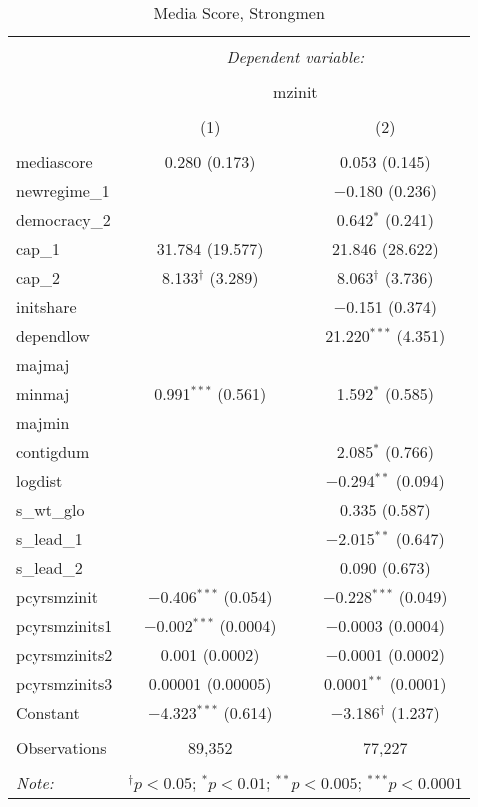 
\begin{table}[!htbp] \centering 
  \caption{Media Score, Strongmen} 
  \label{} 
\begin{tabular}{@{\extracolsep{5pt}}lcc} 
\\[-1.8ex]\hline 
\hline \\[-1.8ex] 
 & \multicolumn{2}{c}{\textit{Dependent variable:}} \\ 
\cline{2-3} 
\\[-1.8ex] & \multicolumn{2}{c}{mzinit} \\ 
\\[-1.8ex] & (1) & (2)\\ 
\hline \\[-1.8ex] 
 mediascore & 0.280 (0.173) & 0.053 (0.145) \\ 
  newregime\_1 &  & $-$0.180 (0.236) \\ 
  democracy\_2 &  & 0.642$^{*}$ (0.241) \\ 
  cap\_1 & 31.784 (19.577) & 21.846 (28.622) \\ 
  cap\_2 & 8.133$^{\dagger}$ (3.289) & 8.063$^{\dagger}$ (3.736) \\ 
  initshare &  & $-$0.151 (0.374) \\ 
  dependlow &  & 21.220$^{***}$ (4.351) \\ 
  majmaj &  &  \\ 
  minmaj & 0.991$^{***}$ (0.561) & 1.592$^{*}$ (0.585) \\ 
  majmin &  &  \\ 
  contigdum &  & 2.085$^{*}$ (0.766) \\ 
  logdist &  & $-$0.294$^{**}$ (0.094) \\ 
  s\_wt\_glo &  & 0.335 (0.587) \\ 
  s\_lead\_1 &  & $-$2.015$^{**}$ (0.647) \\ 
  s\_lead\_2 &  & 0.090 (0.673) \\ 
  pcyrsmzinit & $-$0.406$^{***}$ (0.054) & $-$0.228$^{***}$ (0.049) \\ 
  pcyrsmzinits1 & $-$0.002$^{***}$ (0.0004) & $-$0.0003 (0.0004) \\ 
  pcyrsmzinits2 & 0.001 (0.0002) & $-$0.0001 (0.0002) \\ 
  pcyrsmzinits3 & 0.00001 (0.00005) & 0.0001$^{**}$ (0.0001) \\ 
  Constant & $-$4.323$^{***}$ (0.614) & $-$3.186$^{\dagger}$ (1.237) \\ 
 \hline \\[-1.8ex] 
Observations & 89,352 & 77,227 \\ 
\hline 
\hline \\[-1.8ex] 
\textit{Note:}  & \multicolumn{2}{r}{$^{\dagger} p<0.05$; $^{*} p<0.01$; $^{**} p<0.005$; $^{***} p<0.0001$} \\ 
\end{tabular} 
\end{table} 
